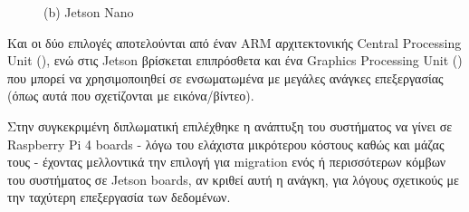 \begin{figure} [H]
\begin{minipage}{.5\textwidth}
      {(b) Jetson Nano }
	\end{minipage}
    \hfill \break
    \decoRule
    \label{fig:embedded-linux-systems}
\end{figure}

Και οι δύο επιλογές αποτελούνται από έναν ARM αρχιτεκτονικής Central Processing Unit (), ενώ στις Jetson βρίσκεται επιπρόσθετα και ένα Graphics Processing Unit () που μπορεί να χρησιμοποιηθεί σε ενσωματωμένα με μεγάλες ανάγκες επεξεργασίας (όπως αυτά που σχετίζονται με εικόνα/βίντεο).

\begin{table}[H]
    \caption[]{Raspberry Pi 4 Model B Specifications}
    \label{tab:raspberry-pi-specs}
    \centering
  \end{table}

  Στην συγκεκριμένη διπλωματική επιλέχθηκε η ανάπτυξη του συστήματος να γίνει σε Raspberry Pi 4 boards - λόγω του ελάχιστα μικρότερου κόστους καθώς και μάζας τους - έχοντας μελλοντικά την επιλογή για migration ενός ή περισσότερων κόμβων του συστήματος σε Jetson boards, αν κριθεί αυτή η ανάγκη, για λόγους σχετικούς με την ταχύτερη επεξεργασία των δεδομένων.

